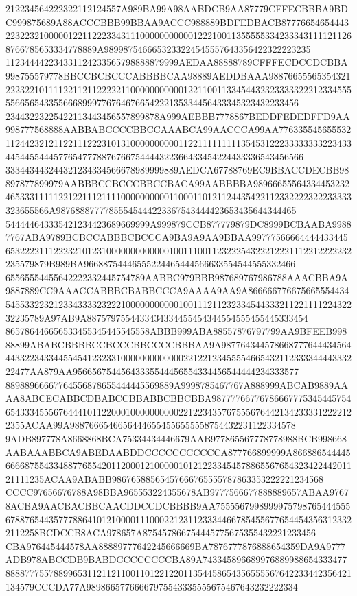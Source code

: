 212234564222322112124557A989BA99A98AABDCB9AA87779CFFECBBBA9BDC999875689A88ACCCBBB99BBAA9ACCC988889BDFEDBACB877766546544432232232100000122112223343111000000000001222100113555553342333431111211268766785653334778889A9899875466653233224545557643356422322223235
112344442234331124233565798888879999AEDAA88888789CFFFECDCCDCBBA998755579778BBCCBCBCCCABBBBCAA98889AEDDBAAA988766555653543212223221011112211211222221100000000000122110011334544323233333222123345555566565433556668999776764676654222135334456433345323432233456
23443223225422113443456557899878A999AEBBB7778867BEDDFEDEDFFD9AA998777568888AABBABCCCCBBCCAAABCA99AACCCA99AA77633554565553211244232121122111222310131000000000011221111111113545312223333333322343344544554445776547778876766754444322366433454224433336543456566
333443443244321234334566678989999889AEDCA67788769EC9BBACCDECBB98897877899979AABBBCCBCCCBBCCBACA99AABBBBA98966655564334453232465333111112212211121111000000000011000110121124435422112332222322233333323655566A98768887777855545444223367543444423653435644344465
544444643335421234423689669999A999879CCB877779879DC8999BCBAABA99887767ABA9789BCBCCABBBCBCCCA9BA9A9AA9BBAA99777566664444433445653222211122232101231000000000000010011100112322254322212221112212222232235579879B989BA96688754446555224465444566633554544555332466
65565554455642222332445754789AABBC979BBB987689767986788AAACBBA9A9887889CC9AAACCABBBCBABBCCCA9AAAA9AA9A86666677667566555443454553322321233433332322210000000000010011121123233454433321122111122432232235789A97AB9A8875797554433434334455454344554555455445333454
865786446656533455345445545558ABBB999ABA88557876797799AA9BFEEB99888899ABABCBBBBCCBCCCBBCCCCBBBAA9A98776434457866877764443456444332234334455454123233100000000000002212212345555466543211233334444333222477AA879AA95665675445643335544456554334456544444234333577
88988966667764556878655444445569889A9998785467767A888999ABCAB9889AAAA8ABCECABBCDBABCCBBABBCBBCBBA987777667767866677753454457546543334555676444101122000100000000002212234357675556764421342333312222122355ACAA99A98876665466564446554556555558754432231122334578
9ADB897778A8668868BCA75334434446679AAB977865567778778988BCB998668AABAAABBCA9ABEDAABDDCCCCCCCCCCCA877766899999A86688654444566668755433488776554201120001210000010121223345457886556765432342244201121111235ACAA9ABABB98676588565457666765555787863353222221234568
CCCC97656676788A98BBA965553224355678AB9777566677888889657ABAA97678ACBA9AACBACBBCAACDDCCDCBBBB9AA75555679989999757987654445556788765443577788641012100001110002212311233344667854556776544543563123322112258BCDCCB8ACA978657A875457866754445775675355432221233456
CBA976445444578AA88889777642245666669BA7876777876888654359DA9A9777ADB978ABCCDB9BABDCCCCCCCCBA89A743345896689976889988654333477888877755788996531121121100110122122011354458654356555567642233442356421134579CCCDA77A98986657766667975543335555675467643232222334
